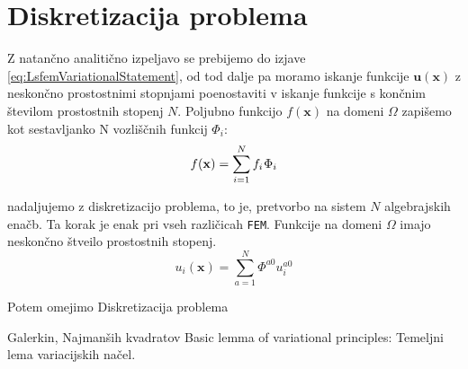 \section{Diskretizacija problema}

Z natančno analitično izpeljavo se prebijemo do izjave \eqref{eq:LsfemVariationalStatement}, od tod dalje pa moramo iskanje funkcije $\mathbf{u(x)}$ z neskončno prostostnimi stopnjami poenostaviti v iskanje funkcije s končnim številom prostostnih stopenj $N$. Poljubno funkcijo $f(\mathbf{x})$ na domeni $\Omega$ zapišemo kot sestavljanko N vozliščnih funkcij $\Phi_i$:
\begin{equation}
    f(\mathbf{x}) = \sum_{i = 1}^N f_i  \mkern1mu \Phi_i
\end{equation}

nadaljujemo z diskretizacijo problema, to je, pretvorbo na sistem $N$ algebrajskih enačb. Ta korak je enak pri vseh različicah \texttt{FEM}. Funkcije na domeni $\Omega$ imajo neskončno štveilo prostostnih stopenj. 
\begin{equation}
    u_i(\mathbf{x}) = \sum_{a = 1}^N \Phi^{a0} u^{a0}_i
\end{equation}

Potem omejimo Diskretizacija problema 

Galerkin, Najmanših kvadratov \cite{JiangB-LSFEM}
Basic lemma of variational principles: Temeljni lema variacijskih načel.